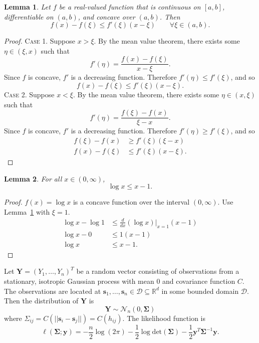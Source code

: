 \documentclass[12pt]{article}
\newtheorem{lemma}{Lemma}
\begin{document}
\begin{lemma} \label{lem:meanconcave}
  Let $f$ be a real-valued function that is continuous on $[a, b]$, differentiable on $(a, b)$, and concave over $(a, b)$. Then
  \[
    f(x) - f(\xi) \leq f'(\xi) (x - \xi) \qquad \forall \xi \in (a, b).
  \]
\end{lemma}

\begin{proof}
  \textsc{Case 1.} Suppose $x > \xi$. By the mean value theorem, there exists some $\eta \in (\xi, x)$ such that
  \[
    f'(\eta) = \frac{f(x) - f(\xi)}{x - \xi}.
  \]
  Since $f$ is concave, $f'$ is a decreasing function. Therefore $f'(\eta) \leq f'(\xi)$, and so
  \[
    f(x) - f(\xi) \leq f'(\xi) (x - \xi).
  \]
  \textsc{Case 2.} Suppose $x < \xi$. By the mean value theorem, there exists some $\eta \in (x, \xi)$ such that
  \[
    f'(\eta) = \frac{f(\xi) - f(x)}{\xi - x}.
  \]
  Since $f$ is concave, $f'$ is a decreasing function. Therefore $f'(\eta) \geq f'(\xi)$, and so
  \begin{align*}
    f(\xi) - f(x) &\geq f'(\xi) (\xi - x) \\
    f(x) - f(\xi) &\leq f'(\xi) (x - \xi).
  \end{align*}
\end{proof}

\begin{lemma} \label{lem:logineq}
  For all $x \in (0, \infty)$,
  \[
    \log x \leq x - 1.
  \]
\end{lemma}

\begin{proof}
  $f(x) = \log x$ is a concave function over the interval $(0, \infty)$. Use Lemma~\ref{lem:meanconcave} with $\xi = 1$.
  \begin{align*}
    \log x - \log 1 &\leq \frac{d}{dx}(\log x) \Big|_{x=1} (x - 1) \\
    \log x - 0 &\leq 1 (x - 1) \\
    \log x &\leq x - 1.
  \end{align*}
\end{proof}

Let $\bm{Y} = (Y_1, \dots, Y_n)^T$ be a random vector consisting of observations from a stationary, isotropic Gaussian process with mean 0 and covariance function $C$. The observations are located at $\bm{s}_1, \dots, \bm{s}_n \in \mathcal{D} \subseteq \mathbb{R}^d$ in some bounded domain $\mathcal{D}$. Then the distribution of $\bm{Y}$ is
\[
  \bm{Y} \sim \mathcal{N}_n(0, \bm{\Sigma})
\]
where $\Sigma_{ij} = C(||\bm{s}_i - \bm{s}_j||) = C(h_{ij})$. The likelihood function is
\[
  \ell(\bm{\Sigma}; \bm{y}) = -\frac{n}{2} \log(2\pi) - \frac{1}{2} \log \textrm{det}(\bm{\Sigma}) - \frac{1}{2} \bm{y}^T \bm{\Sigma}^{-1} \bm{y}.
\]
\end{document}
